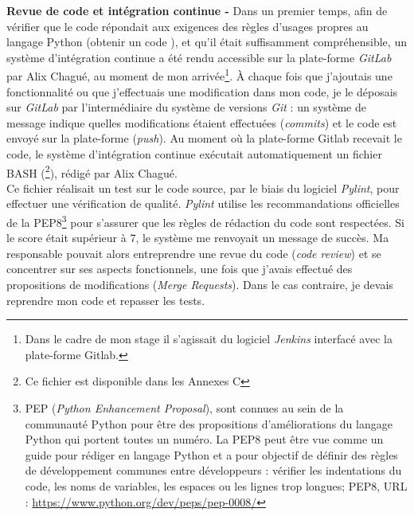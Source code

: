 \textbf{Revue de code et intégration continue - }Dans un premier temps, afin de vérifier que le code répondait aux exigences des règles d'usages propres au langage Python (obtenir un code ), et qu'il était suffisamment compréhensible, un système d'intégration continue a été rendu accessible sur la plate-forme \textit{GitLab} par Alix Chagué, au moment de mon arrivée\footnote{Dans le cadre de mon stage il s'agissait du logiciel \textit{Jenkins} interfacé avec la plate-forme Gitlab.}. À chaque fois que j'ajoutais une fonctionnalité ou que j'effectuais une modification dans mon code, je le déposais sur \textit{GitLab} par l'intermédiaire du système de versions \textit{Git} : un système de message indique quelles modifications étaient effectuées (\textit{commits}) et le code est envoyé sur la plate-forme (\textit{push}). Au moment où la plate-forme Gitlab recevait le code, le système d'intégration continue exécutait automatiquement un fichier BASH (\footnote{Ce fichier est disponible dans les Annexes C}), rédigé par Alix Chagué. \\

Ce fichier réalisait un test sur le code source, par le biais du logiciel \textit{Pylint}, pour effectuer une vérification de qualité. \textit{Pylint} utilise les recommandations officielles de la PEP8\footnote{PEP (\textit{Python Enhancement Proposal}), sont connues au sein de la communauté Python pour être des propositions d'améliorations du langage Python qui portent toutes un numéro. La PEP8 peut être vue comme un guide pour rédiger en langage Python et a pour objectif de définir des règles de développement communes entre développeurs : vérifier les indentations du code, les noms de variables, les espaces ou les lignes trop longues; PEP8, URL : \url{https://www.python.org/dev/peps/pep-0008/}} pour s'assurer que les règles de rédaction du code sont respectées. Si le score était supérieur à 7, le système me renvoyait un message de succès. Ma responsable pouvait alors entreprendre une revue  du code (\textit{code review}) et se concentrer sur ses aspects fonctionnels, une fois que j'avais effectué des propositions de modifications (\textit{Merge Requests}). Dans le cas contraire, je devais reprendre mon code et repasser les tests. \\

